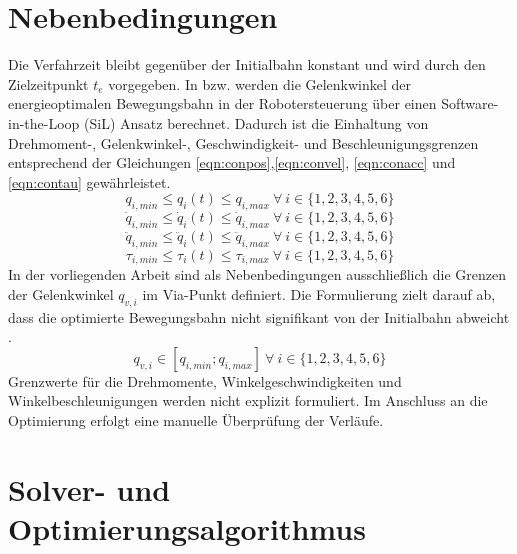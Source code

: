 \section{Nebenbedingungen}
Die Verfahrzeit bleibt gegenüber der Initialbahn konstant und wird durch den Zielzeitpunkt $t_e$ vorgegeben. 
In \cite[S.~40]{Eggers.2019} bzw. \cite[S.~5]{Hansen.2012} werden die Gelenkwinkel der energieoptimalen Bewegungsbahn in der Robotersteuerung über einen Software-in-the-Loop (SiL) Ansatz berechnet. Dadurch ist die Einhaltung von Drehmoment-, Gelenkwinkel-, Geschwindigkeit- und Beschleunigungsgrenzen entsprechend der Gleichungen \ref{eqn:conpos},\ref{eqn:convel}, \ref{eqn:conacc} und \ref{eqn:contau} gewährleistet. 
%
\begin{equation}
	\label{eqn:conpos}
	q_{i,min} \leq q_{i}(t) \leq q_{i,max}  ~\forall~ i \in \{1,2,3,4,5,6\}
\end{equation}
%
\begin{equation}
	\label{eqn:convel}
	\dot{q}_{i,min} \leq \dot{q}_{i}(t) \leq \dot{q}_{i,max}  ~\forall~ i \in \{1,2,3,4,5,6\}
\end{equation}
%
\begin{equation}
	\label{eqn:conacc}
	\ddot{q}_{i,min} \leq \ddot{q}_{i}(t) \leq \ddot{q}_{i,max}  ~\forall~ i \in \{1,2,3,4,5,6\}
\end{equation}
%
\begin{equation}
	\label{eqn:contau}
	\tau_{i,min} \leq \tau_{i}(t) \leq \tau_{i,max}  ~\forall~ i \in \{1,2,3,4,5,6\}
\end{equation}
%
In der vorliegenden Arbeit sind als Nebenbedingungen ausschließlich die Grenzen der Gelenkwinkel $q_{v,i}$ im Via-Punkt definiert. Die Formulierung zielt darauf ab, dass die optimierte Bewegungsbahn nicht signifikant von der Initialbahn abweicht \cite[S.~5]{Hansen.2012}.
\begin{equation}
	q_{v,i} \in [q_{i,min};q_{i,max}] ~\forall~ i \in \{1,2,3,4,5,6\}
\end{equation}
Grenzwerte für die Drehmomente, Winkelgeschwindigkeiten und Winkelbeschleunigungen werden nicht explizit formuliert.  Im Anschluss an die Optimierung erfolgt eine manuelle Überprüfung der Verläufe.
%
\section{Solver- und Optimierungsalgorithmus}
%
